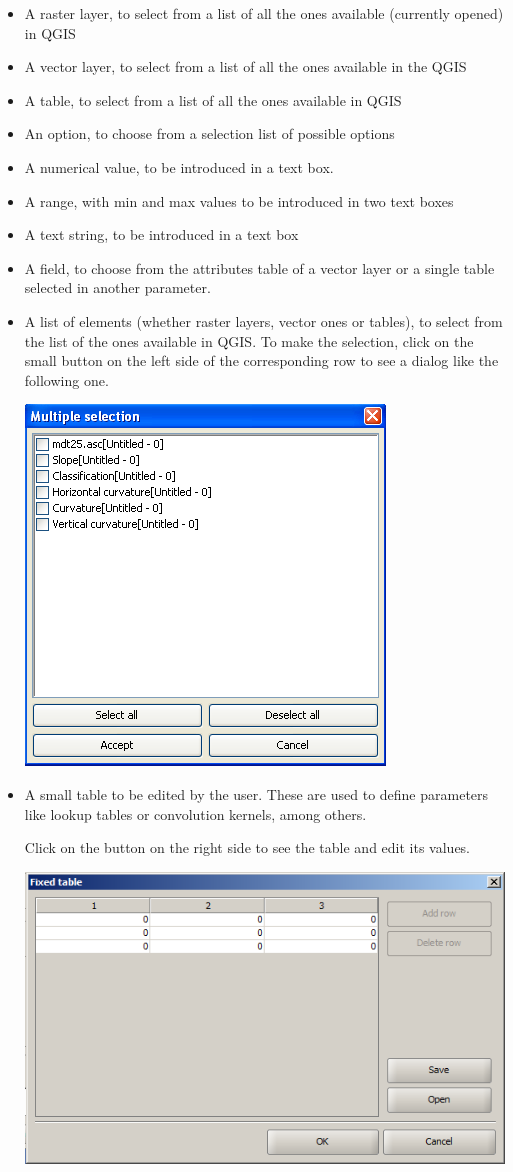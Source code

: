 \begin{itemize}
	\item A raster layer, to select from a list of all the ones available (currently opened) in QGIS
	\item A vector layer, to select from a list of all the ones available in the QGIS
	\item A table, to select from a list of all the ones available in QGIS
	\item An option, to choose from a selection list of possible options
	\item A numerical value, to be introduced in a text box. 
	\item A range, with min and max values to be introduced in two text boxes
	\item A text string, to be introduced in a text box
	\item A field, to choose from the attributes table of a vector layer or a single table selected in another parameter.
	\item A list of elements (whether raster layers, vector ones or tables), to select from the list of the ones available in QGIS. To make the selection, click on the small button on the left side of the corresponding row to see a dialog like the following one.
		\begin{center}
		\includegraphics[width=.4\columnwidth]{multiple_selection.png}
		\end{center}		
	\item A small table to be edited by the user. These are used to define parameters like lookup tables or convolution kernels, among others.

	Click on the button on the right side to see the table and edit its values. 
\begin{center}
\includegraphics[width=.8\columnwidth]{fixed_table.png}
\end{center}


\end{itemize}
